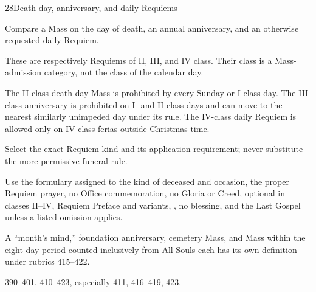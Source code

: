 \begin{casefile}{28}{Death-day, anniversary, and daily Requiems}
\item[Calendar facts] Compare a Mass on the day of death, an annual anniversary, and an otherwise requested daily Requiem.
\item[Ranks and rows] These are respectively Requiems of II, III, and IV class.  Their class is a Mass-admission category, not the class of the calendar day.
\item[Impeded item] The II-class death-day Mass is prohibited by every Sunday or I-class day.  The III-class anniversary is prohibited on I- and II-class days and can move to the nearest similarly unimpeded day under its rule.  The IV-class daily Requiem is allowed only on IV-class ferias outside Christmas time.
\item[Mass category] Select the exact Requiem kind and its application requirement; never substitute the more permissive funeral rule.
\item[Assembly] Use the formulary assigned to the kind of deceased and occasion, the proper Requiem prayer, no Office commemoration, no Gloria or Creed, optional  in classes II--IV, Requiem Preface and variants, , no blessing, and the Last Gospel unless a listed omission applies.
\item[Boundary] A “month's mind,” foundation anniversary, cemetery Mass, and Mass within the eight-day period counted inclusively from All Souls each has its own definition under rubrics 415--422.
\item[Rubric locus] 390--401, 410--423, especially 411, 416--419, 423.
\end{casefile}

